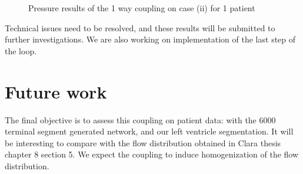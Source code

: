 \documentclass[a4paper, 11pt]{article} %
\begin{document}
\begin{figure}[hbtp]
\begin{adjustwidth}{-2cm}{}
\begin{center}
\hspace{0.05cm}
\caption{Pressure results of the 1 way coupling on case (ii) for 1 patient}
\label{fig:pat_caseii}
\end{center}
\end{adjustwidth}
\end{figure}
 

Technical issues need to be resolved, and these results will be submitted to further investigations. We are also working on implementation of the last step of the loop.


\section{Future work}

The final objective is to assess this coupling on patient data: with the $6000$ terminal segment generated network, and our left ventricle segmentation.
It will be interesting to compare with the flow distribution obtained in Clara thesis chapter 8 section 5. We expect the coupling to induce homogenization of the flow distribution. 
\end{document}
